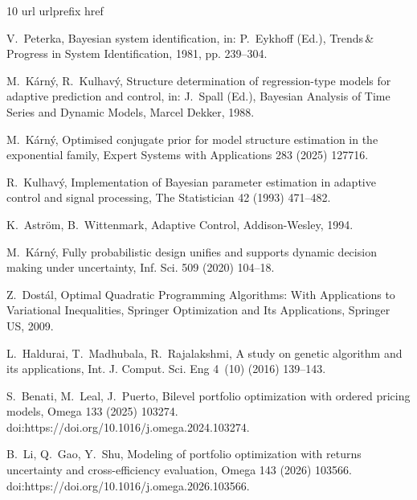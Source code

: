 \documentclass[final,3p,times,twocolumn]{elsarticle}
\begin{document}
\begin{thebibliography}{10}
\setlength{\itemsep}{0pt}\setlength{\parskip}{0pt}
\expandafter\ifx\csname url\endcsname\relax
  \def\url#1{\texttt{#1}}\fi
\expandafter\ifx\csname urlprefix\endcsname\relax\def\urlprefix{URL }\fi
\expandafter\ifx\csname href\endcsname\relax
  \def\href#1#2{#2} \def\path#1{#1}\fi

V.~Peterka, {B}ayesian system identification, in: P.~Eykhoff (Ed.),
  Trends\,\&\,Progress in System Identification, 1981, pp. 239--304.

M.~K\'{a}rn\'{y}, R.~Kulhav\'{y}, Structure determination of regression-type
  models for adaptive prediction and control, in: J.~Spall (Ed.), {B}ayesian
  Analysis of Time Series and Dynamic Models, Marcel Dekker, 1988.

M.~K\'{a}rn\'{y}, Optimised conjugate prior for model structure estimation in
  the exponential family, Expert Systems with Applications 283 (2025) 127716.

R.~Kulhav{\'y}, Implementation of {B}ayesian parameter estimation in adaptive
  control and signal processing, The Statistician 42 (1993) 471--482.

K.~{A}str{\"{o}}m, B.~Wittenmark, Adaptive Control, Addison-Wesley, 1994.

M.~K\'{a}rn\'{y}, Fully probabilistic design unifies and supports dynamic
  decision making under uncertainty, Inf. Sci. 509 (2020) 104--18.

Z.~Dost{\'a}l, Optimal Quadratic Programming Algorithms: With Applications to
  Variational Inequalities, Springer Optimization and Its Applications,
  Springer US, 2009.

L.~Haldurai, T.~Madhubala, R.~Rajalakshmi, A study on genetic algorithm and its
  applications, Int. J. Comput. Sci. Eng 4~(10) (2016) 139--143.

S.~Benati, M.~Leal, J.~Puerto, Bilevel portfolio optimization with ordered
  pricing models, Omega 133 (2025) 103274.
\newblock \href {https://doi.org/https://doi.org/10.1016/j.omega.2024.103274}
  {\path{doi:https://doi.org/10.1016/j.omega.2024.103274}}.

B.~Li, Q.~Gao, Y.~Shu, Modeling of portfolio optimization with returns
  uncertainty and cross-efficiency evaluation, Omega 143 (2026) 103566.
\newblock \href {https://doi.org/https://doi.org/10.1016/j.omega.2026.103566}
  {\path{doi:https://doi.org/10.1016/j.omega.2026.103566}}.


\end{thebibliography}
\end{document}
